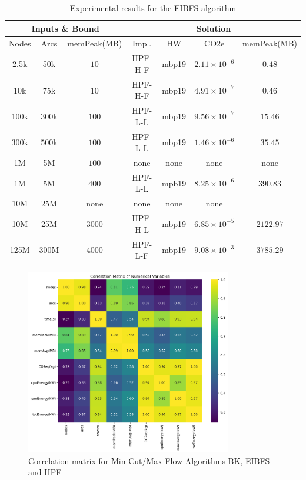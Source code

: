 \documentclass[a4paper,singleside,12pt]{report} %
\begin{document}
\begin{table}[h!]
    \centering
    \begin{tabular}{|ccc|cccc|}
        \hline
        \multicolumn{3}{|c|}{Inputs \& Bound} & \multicolumn{4}{c|}{Solution} \\
        \hline
        Nodes & Arcs & memPeak(MB) & Impl. & HW & CO2e & memPeak(MB) \\
        \hline
        2.5k & 50k & $10$ & HPF-H-F & mbp19 & $2.11 \times 10^{-6}$ & $0.48$ \\
        10k & 75k & $10$ & HPF-H-F & mbp19 & $4.91 \times 10^{-7}$ & $0.46$ \\
        100k & 300k & $100$ & HPF-L-L & mbp19 & $9.56 \times 10^{-7}$ & $15.46$ \\
        300k & 500k & $100$ & HPF-L-L & mbp19 & $1.46 \times 10^{-6}$ & $35.45$ \\
        1M & 5M & $100$ & none & none & none & none \\
        1M & 5M & $400$ & HPF-L-L & mpb19 & $8.25 \times 10^{-6}$ & $390.83$ \\
        10M & 25M & none & none & none & none \\
        10M & 25M & $3000$ & HPF-H-L & mbp19 & $6.85 \times 10^{-5}$ & $2122.97$ \\
        125M & 300M & $4000$ & HPF-L-F & mbp19 & $9.08 \times 10^{-3}$ & $3785.29$ \\
        \hline
    \end{tabular}
    \caption{Experimental results for the EIBFS algorithm}
    \label{tab:hpf_results}
\end{table}

\begin{figure}[h!]
    \centering
    \includegraphics[width=0.8\textwidth]{imgs/max_flow_corr_mat.png}
    \caption{Correlation matrix for Min-Cut/Max-Flow Algorithms BK, EIBFS and HPF}
    \label{fig:max_flow_corr_mat}
\end{figure}
\end{document}
